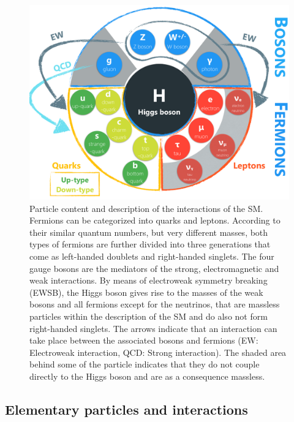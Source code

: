 \begin{figure}[h!]
    \centering
    \includegraphics[width=.7\textwidth]{Figures/theory/Masterthesis_diagrams_SM/Masterthesis_diagrams_SM.pdf}
    \caption[Particle content and description of the interactions of the SM.]{Particle content and description of the interactions of the SM. Fermions can be categorized into quarks and leptons. 
    According to their similar quantum numbers, but very different masses, both types of fermions are further divided into three generations that come as left-handed doublets and right-handed singlets.
    The four gauge bosons are the mediators of the strong, electromagnetic and weak interactions. By means of electroweak symmetry breaking (EWSB), the Higgs boson gives rise to the masses of the weak bosons and all fermions except for the neutrinos, that are 
    massless particles within the description of the SM and do also not form right-handed singlets. The arrows indicate that an interaction can take place between the associated bosons
     and fermions (EW: Electroweak interaction, QCD: Strong interaction). The shaded area behind some of the particle indicates that they do not couple directly to the Higgs boson and are as a consequence massless.}\label{theory:SM_infographics}
\end{figure}

\subsection{Elementary particles and interactions} 

